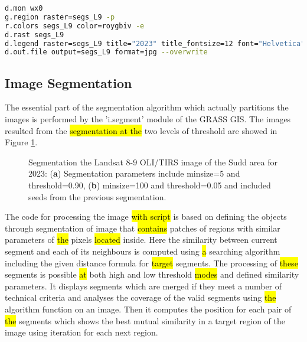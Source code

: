 \documentclass[sustainability,article,submit,pdftex,moreauthors]{Definitions/mdpi}
\begin{document}
\begin{lstlisting}[language=bash,caption=GRASS GIS code for mapping the segmented raster image Landsat 9 OLI/TIRS,style=mystyle,label={lst04}]
d.mon wx0
g.region raster=segs_L9 -p
r.colors segs_L9 color=roygbiv -e
d.rast segs_L9
d.legend raster=segs_L9 title="2023" title_fontsize=12 font="Helvetica" fontsize=10 bgcolor=white border_color=white
d.out.file output=segs_L9 format=jpg --overwrite
\end{lstlisting}

\subsection{Image Segmentation}
The essential part of the segmentation algorithm which actually partitions the images is performed by the 'i.segment' module of the GRASS GIS. The images resulted from the \hl{segmentation at the }two levels of threshold are showed in Figure \ref{fig06}. 

\begin{figure}[H]
\hspace{10pt}
\caption{Segmentation the Landsat 8-9 OLI/TIRS image of the Sudd area for 2023: (\textbf{a}) Segmentation parameters include minsize=5 and threshold=0.90, (\textbf{b}) minsize=100 and threshold=0.05 and included seeds from the previous segmentation.}\label{fig06}
\end{figure}

The\hl{ }code for processing the image \hl{with script }is based on defining the objects through segmentation of image that \hl{contains} patches of regions with similar parameters of \hl{the }pixels \hl{located }inside. Here the similarity between\hl{ }current segment and each of its neighbours is computed using \hl{a} searching algorithm including the given distance formula for \hl{target }segments. The processing of \hl{these }segments is possible \hl{at }both high and low threshold \hl{modes} and defined similarity parameters. It displays segments which are merged if they meet a number of technical criteria and analyses the coverage of the valid segments using \hl{the }algorithm function on an image. Then it computes the position for each pair of \hl{the }segments which shows the best mutual similarity in a target region\hl{ }of the image using iteration for each next region. 
\end{document}
